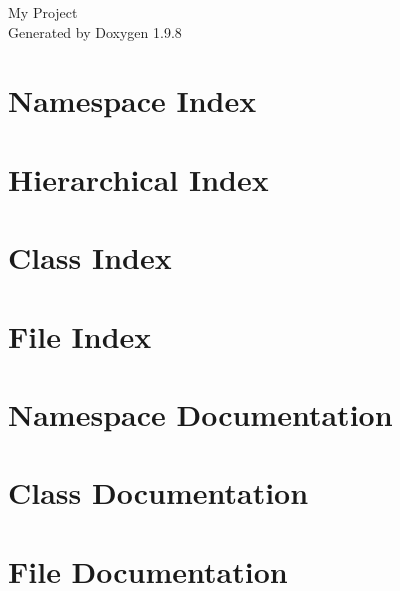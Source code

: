 \documentclass[twoside]{book}
\newcommand{\+}{\discretionary{\mbox{\scriptsize$\hookleftarrow$}}{}{}}
\newcommand{\clearemptydoublepage}{%
    \newpage{\pagestyle{empty}\cleardoublepage}%
  }
\begin{document}
  \raggedbottom
    \hypersetup{pageanchor=false,
                bookmarksnumbered=true,
                pdfencoding=unicode
               }
  \begin{titlepage}
  \vspace*{7cm}
  \begin{center}%
  {\Large My Project}\\
  \vspace*{1cm}
  {\large Generated by Doxygen 1.9.8}\\
  \end{center}
  \end{titlepage}
  \clearemptydoublepage
  \tableofcontents
  \clearemptydoublepage
  \hypersetup{pageanchor=true}
\chapter{Namespace Index}

\chapter{Hierarchical Index}

\chapter{Class Index}

\chapter{File Index}

\chapter{Namespace Documentation}







\chapter{Class Documentation}

\chapter{File Documentation}














  \backmatter
  \newpage
  \clearemptydoublepage
  \printindex
\end{document}
